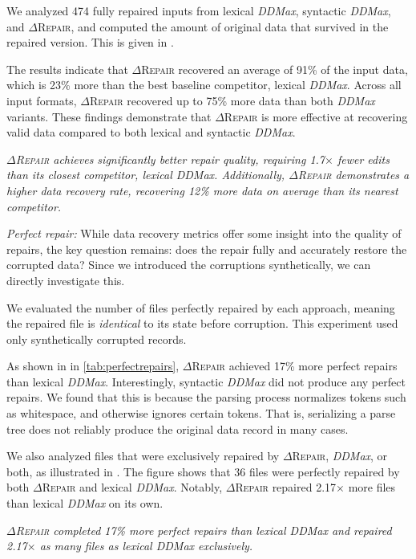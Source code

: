 \documentclass[acmsmall,screen,review,anonymous]{acmart}
\newenvironment{result}{\begin{framed}\centering\it}{\end{framed}}
\newcommand{\approach}{\textsc{$\Delta$Repair}\xspace}
\newcommand{\ddmax}{\textit{DDMax}\xspace}
\newcommand{\drepair}{\approach}
\begin{document}
We analyzed 474 fully repaired inputs from lexical \ddmax, syntactic \ddmax, and
\drepair, and computed the amount of original data that survived in the repaired version. This is given in .

The results indicate that \drepair recovered an average of 91\% of the input
data, which is 23\% more than the best baseline competitor, lexical \ddmax.
Across all input formats, \drepair recovered up to 75\% more data than both
\ddmax variants.
These findings demonstrate that \drepair is more effective at recovering valid
data compared to both lexical and syntactic \ddmax.

\begin{result}
\drepair achieves significantly better repair quality, requiring 1.7$\times$
fewer edits than its closest competitor, lexical \ddmax.
Additionally, \drepair demonstrates a higher data recovery rate, recovering 12\%
more data on average than its nearest competitor.
\end{result}

\noindent\emph{Perfect repair:} While data recovery metrics offer some insight
into the quality of repairs, the key question remains: does the repair fully and
accurately restore the corrupted data?
Since we introduced the corruptions synthetically, we can directly investigate
this.

We evaluated the number of files perfectly repaired by each approach, meaning
the repaired file is \emph{identical} to its state before corruption.
This experiment used only synthetically corrupted records.

As shown in in \cref{tab:perfectrepairs},
\drepair achieved 17\% more perfect repairs than lexical \ddmax.
Interestingly, syntactic \ddmax did not produce any perfect repairs.
We found that this is because the parsing process normalizes tokens such
as whitespace, and otherwise ignores certain tokens. That is, serializing
a parse tree does not reliably produce the original data record in many cases.

We also analyzed files that were exclusively repaired by \drepair, \ddmax, or
both, as illustrated in .
The figure shows that 36 files were perfectly repaired by both \drepair and
lexical \ddmax.
Notably, \drepair repaired 2.17$\times$ more files than lexical \ddmax on its own.

\begin{result}
\drepair completed 17\% more perfect repairs than lexical \ddmax and
repaired 2.17$\times$ as many files as lexical \ddmax exclusively.
\end{result}
\end{document}

